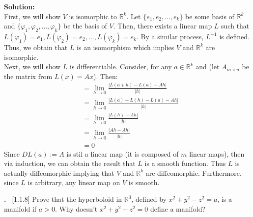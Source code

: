 \documentclass{article}
\newcounter{problem}
\newcounter{solution}
\newcommand\Problem{%
  \stepcounter{problem}%
  \textbf{\theproblem.}~%
  \setcounter{solution}{0}%
}
\newcommand\TheSolution{%
  \textbf{Solution:}\\%
}
\begin{document}
\TheSolution First, we will show $V$ is isomorphic to %
$\mathbb{R}^k$. Let $\{e_1,e_2,\hdots,e_k\}$ be some basis of %
$\mathbb{R}^k$ and $\{\varphi_1,\varphi_2,\hdots,\varphi_k\}$ %
be the basis of $V$. Then, there exists a linear map $L$ such %
that $L(\varphi_1)=e_1,L(\varphi_2)=e_2,\hdots,L(\varphi_k)=e_k$.
By a similar process, $L^{-1}$ is defined. Thus, we obtain that %
$L$ is an isomorphism which implies $V$ and $\mathbb{R}^k$ are %
isomorphic.\\
Next, we will show $L$ is differentiable. Consider, for any %
$a\in\mathbb{R}^k$ and %
(let $A_{m\times n}$ be the matrix from $L(x) = Ax$). Then:
\begin{align*}
    &= \lim_{h\to0} \frac{|L(a+h)-L(a)-Ah|}{|h|}\\
    &= \lim_{h\to0} \frac{|L(a)+L(h)-L(a)-Ah|}{|h|}\\
    &= \lim_{h\to0} \frac{|L(h)-Ah|}{|h|}\\
    &= \lim_{h\to0} \frac{|Ah-Ah|}{|h|}\\
    &= 0
\end{align*}
Since $DL(a) := A$ is stil a linear map (it is composed of %
$m$ linear maps), then via induction, we can obtain the %
result that $L$ is a smooth function. Thus $L$ is actually %
diffeomorphic implying that $V$ and $\mathbb{R}^k$ are %
diffeomorphic. Furthermore, since $L$ is arbitrary, any %
linear map on $V$ is smooth.

\Problem[1.1.8] Prove that the hyperboloid in $\mathbb{R}^3$, %
defined by $x^2+y^2-z^2 = a$, is a manifold if $a>0$. Why %
doesn't $x^2+y^2-z^2=0$ define a manifold?
\end{document}
